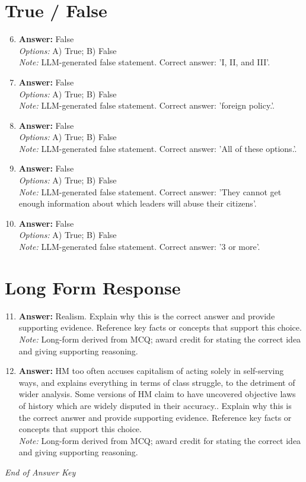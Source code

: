 \documentclass[12pt]{article}
\begin{document}
\section*{True / False}
\begin{enumerate}[label=\arabic*.]
\setcounter{enumi}{5}
\item \textbf{Answer:} False
\\ \textit{Options:} A) True; B) False
\\ \textit{Note:} LLM-generated false statement. Correct answer: 'I, II, and III'.
\item \textbf{Answer:} False
\\ \textit{Options:} A) True; B) False
\\ \textit{Note:} LLM-generated false statement. Correct answer: 'foreign policy.'.
\item \textbf{Answer:} False
\\ \textit{Options:} A) True; B) False
\\ \textit{Note:} LLM-generated false statement. Correct answer: 'All of these options.'.
\item \textbf{Answer:} False
\\ \textit{Options:} A) True; B) False
\\ \textit{Note:} LLM-generated false statement. Correct answer: 'They cannot get enough information about which leaders will abuse their citizens'.
\item \textbf{Answer:} False
\\ \textit{Options:} A) True; B) False
\\ \textit{Note:} LLM-generated false statement. Correct answer: '3 or more'.
\end{enumerate}

\section*{Long Form Response}
\begin{enumerate}[label=\arabic*.]
\setcounter{enumi}{10}
\item \textbf{Answer:} Realism. Explain why this is the correct answer and provide supporting evidence. Reference key facts or concepts that support this choice.
\\ \textit{Note:} Long-form derived from MCQ; award credit for stating the correct idea and giving supporting reasoning.
\item \textbf{Answer:} HM too often accuses capitalism of acting solely in self-serving ways, and explains everything in terms of class struggle, to the detriment of wider analysis. Some versions of HM claim to have uncovered objective laws of history which are widely disputed in their accuracy.. Explain why this is the correct answer and provide supporting evidence. Reference key facts or concepts that support this choice.
\\ \textit{Note:} Long-form derived from MCQ; award credit for stating the correct idea and giving supporting reasoning.
\end{enumerate}

\vfill
\noindent\textit{End of Answer Key}
\end{document}
